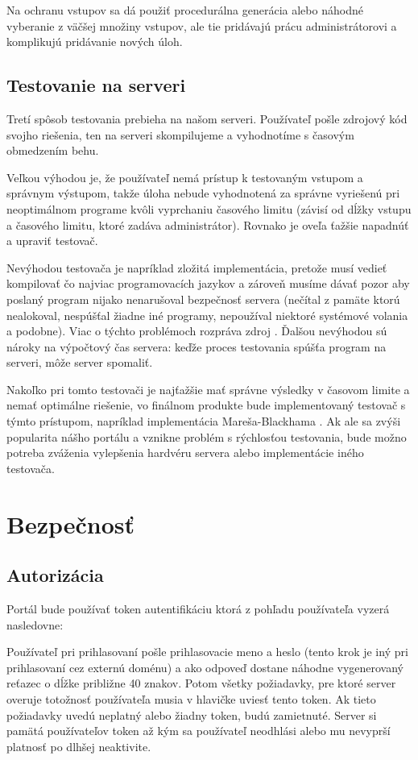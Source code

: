 Na ochranu vstupov sa dá použiť procedurálna generácia alebo náhodné vyberanie z väčšej množiny vstupov, ale tie pridávajú prácu administrátorovi a komplikujú pridávanie nových úloh.

\subsection{Testovanie na serveri}
Tretí spôsob testovania prebieha na našom serveri. Používateľ pošle zdrojový kód svojho riešenia, ten na serveri skompilujeme a vyhodnotíme s časovým obmedzením behu.

Veľkou výhodou je, že používateľ nemá prístup k testovaným vstupom a správnym výstupom,
takže úloha nebude vyhodnotená za správne vyriešenú pri neoptimálnom programe kvôli vyprchaniu
časového limitu (závisí od dĺžky vstupu a časového limitu, ktoré zadáva administrátor).
Rovnako je oveľa ťažšie napadnúť a upraviť testovač.

Nevýhodou testovača je napríklad zložitá implementácia, pretože musí vedieť kompilovať čo
najviac programovacích jazykov a zároveň musíme dávať pozor aby poslaný program nijako
nenarušoval bezpečnosť servera (nečítal z pamäte ktorú nealokoval, nespúšťal žiadne iné programy,
nepoužíval niektoré systémové volania a podobne). Viac o týchto problémoch
rozpráva zdroj \cite{misof}. Ďalšou nevýhodou sú nároky na výpočtový čas servera:
keďže proces testovania spúšťa program na serveri, môže server spomaliť.

Nakoľko pri tomto testovači je najťažšie mať správne výsledky v časovom limite a
nemať optimálne riešenie, vo finálnom produkte bude implementovaný testovač s týmto prístupom,
napríklad implementácia Mareša-Blackhama \cite{mares}. Ak ale sa zvýši
popularita nášho portálu a vznikne problém s rýchlosťou testovania, bude možno potreba zváženia
vylepšenia hardvéru servera alebo implementácie iného testovača.

\section{Bezpečnosť}
\subsection{Autorizácia}
\label{authorization}
Portál bude používať token autentifikáciu ktorá z pohľadu používateľa vyzerá nasledovne:

Používateľ pri prihlasovaní pošle prihlasovacie meno a heslo (tento krok je iný pri prihlasovaní cez externú doménu) a ako odpoveď
dostane náhodne vygenerovaný reťazec o dĺžke približne 40 znakov. Potom všetky požiadavky, pre ktoré server overuje totožnosť používateľa
musia v hlavičke uviesť tento token. Ak tieto požiadavky uvedú neplatný alebo žiadny token, budú zamietnuté.
Server si pamätá používateľov token až kým sa používateľ neodhlási alebo mu nevyprší platnosť po dlhšej neaktivite.

